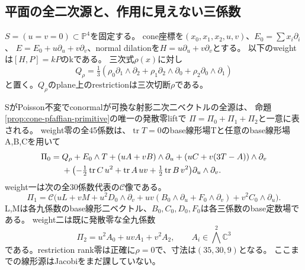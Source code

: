 \subsection{平面の全二次源と、作用に見えない三係数}
$S=(u=v=0)\subset\mathbb P^4$を固定する。
cone座標を$(x_0,x_1,x_2,u,v)$、$E_0=\sum x_i\partial_i$、
$E=E_0+u\partial_u+v\partial_v$、normal dilationを$H=u\partial_u+v\partial_v$とする。
以下のweightは$[H,P]=kP$のkである。
三次式$\rho(x)$に対し
\[
 Q_\rho=\tfrac13(\rho_0\partial_1\wedge\partial_2+
 \rho_1\partial_2\wedge\partial_0+\rho_2\partial_0\wedge\partial_1)
\]
と置く。$Q_\rho$のplane上のrestrictionは三次切断$\rho$である。

\begin{theorem}\label{thm:conductor-plane-reconstruction}
SがPoisson不変でconormalが可換な射影二次二ベクトルの全源は、
命題\ref{prop:cone-pfaffian-primitive}の唯一の発散零liftで
$\Pi=\Pi_0+\Pi_1+\Pi_2$と一意に表される。
weight零の全45係数は、$\operatorname{tr}T=0$のbase線形場Tと任意のbase線形場A,B,Cを用いて
\begin{align}
 \Pi_0={}&Q_\rho+E_0\wedge T
 +(uA+vB)\wedge\partial_u
 +(uC+v(3T-A))\wedge\partial_v\notag\\
 &+\bigl(-\tfrac12\operatorname{tr}C\,u^2+
 \operatorname{tr}A\,uv+\tfrac12\operatorname{tr}B\,v^2\bigr)
 \partial_u\wedge\partial_v .\label{eq:conductor-weight-zero}
\end{align}
weight一は次の全30係数代表の$\mathcal C$像である。
\begin{equation}
 \Pi_1=\mathcal C\bigl(uL+vM+u^2D_0\wedge\partial_v
 +uv(B_0\wedge\partial_u+F_0\wedge\partial_v)
 +v^2C_0\wedge\partial_u\bigr).\label{eq:conductor-weight-one}
\end{equation}
L,Mは各九係数のbase線形二ベクトル、$B_0,C_0,D_0,F_0$は各三係数のbase定数場である。
weight二は既に発散零な全九係数
\begin{equation}
 \Pi_2=u^2A_0+uvA_1+v^2A_2,\qquad A_i\in\bigwedge^2\mathbb C^3
 \label{eq:conductor-weight-two}
\end{equation}
である。restriction rank零は正確に$\rho=0$で、寸法は$(35,30,9)$となる。
ここまでの線形源はJacobiをまだ課していない。
\end{theorem}
